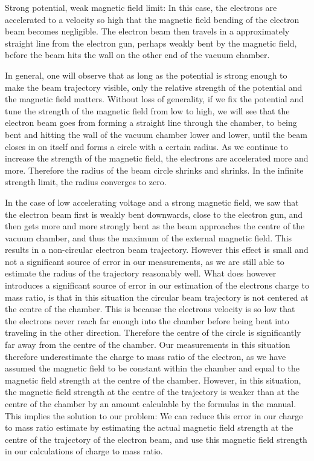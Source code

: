\documentclass[a4paper,12pt]{article}
\begin{document}
Strong potential, weak magnetic field limit: In this case, the electrons are accelerated to a velocity so high that the magnetic field bending of the electron beam becomes negligible.
The electron beam then travels in a approximately straight line from the electron gun, perhaps weakly bent by the magnetic field, before the beam hits the wall on
the other end of the vacuum chamber.

In general, one will observe that as long as the potential is strong enough to make the beam trajectory visible, only the relative strength of the 
potential and the magnetic field matters. Without loss of generality, if we fix the potential and tune the strength of the magnetic field from low to high, 
we will see that the electron beam goes from forming a straight line through the chamber, to being bent and hitting the wall of the vacuum chamber lower 
and lower, until the beam closes in on itself and forms a circle with a certain radius. As we continue to increase the strength of the magnetic field, the 
electrons are accelerated more and more. Therefore the radius of the beam circle shrinks and shrinks. In the infinite strength limit, the radius 
converges to zero. 

In the case of low accelerating voltage and a strong magnetic field, we saw that the electron beam first is weakly bent downwards, close to the electron gun, 
and then gets more and more strongly bent as the beam approaches the centre of the vacuum chamber, and thus the maximum of the external magnetic field. This 
results in a non-circular electron beam trajectory. However this effect is small and not a significant source of error in our measurements, as we are still
able to estimate the radius of the trajectory reasonably well. What does however introduces a significant source of error in our estimation of the electrons 
charge to mass ratio, is that in this situation the circular beam trajectory is not centered at the centre of the chamber. This is because the electrons velocity 
is so low that the electrons never reach far enough into the chamber before being bent into traveling in the other direction. Therefore the centre of the 
circle is significantly far away from the centre of the chamber. Our measurements in this situation therefore underestimate the charge to mass ratio of the electron, 
as we have assumed the magnetic field to be constant within the chamber and equal to the magnetic field strength at the centre of the chamber. However, in this situation, 
the magnetic field strength at the centre of the trajectory is weaker than at the centre of the chamber by an amount calculable by the formulas in the manual. 
This implies the solution to our problem: We can reduce this error in our charge to mass ratio estimate by estimating the actual magnetic field strength at 
the centre of the trajectory of the electron beam, and use this magnetic field strength in our calculations of charge to mass ratio.
\end{document}
